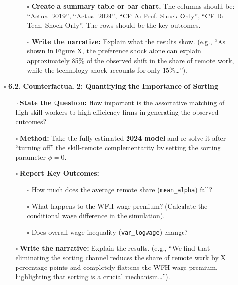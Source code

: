 \documentclass[
  11pt,
  letterpaper,
  DIV=11,
  numbers=noendperiod]{scrartcl}
\providecommand{\tightlist}{%
  \setlength{\itemsep}{0pt}\setlength{\parskip}{0pt}}\usepackage{longtable,booktabs,array}
\begin{document}
\begin{itemize}
\begin{itemize}
    \begin{itemize}
    \tightlist
    \item[$\square$]
      \textbf{Create a summary table or bar chart.} The columns should
      be: ``Actual 2019'', ``Actual 2024'', ``CF A: Pref. Shock Only'',
      ``CF B: Tech. Shock Only''. The rows should be the key outcomes.
    \item[$\square$]
      \textbf{Write the narrative:} Explain what the results show.
      (e.g., ``As shown in Figure X, the preference shock alone can
      explain approximately 85\% of the observed shift in the share of
      remote work, while the technology shock accounts for only
      15\%\ldots{}'').
    \end{itemize}
  \end{itemize}
\item[$\square$]
  \textbf{6.2. Counterfactual 2: Quantifying the Importance of Sorting}

  \begin{itemize}
  \tightlist
  \item[$\square$]
    \textbf{State the Question:} How important is the assortative
    matching of high-skill workers to high-efficiency firms in
    generating the observed outcomes?
  \item[$\square$]
    \textbf{Method:} Take the fully estimated \textbf{2024 model} and
    re-solve it after ``turning off'' the skill-remote complementarity
    by setting the sorting parameter \textbf{\(\phi = 0\)}.
  \item[$\square$]
    \textbf{Report Key Outcomes:}

    \begin{itemize}
    \tightlist
    \item[$\square$]
      How much does the average remote share (\texttt{mean\_alpha})
      fall?
    \item[$\square$]
      What happens to the WFH wage premium? (Calculate the conditional
      wage difference in the simulation).
    \item[$\square$]
      Does overall wage inequality (\texttt{var\_logwage}) change?
    \end{itemize}
  \item[$\square$]
    \textbf{Write the narrative:} Explain the results. (e.g., ``We find
    that eliminating the sorting channel reduces the share of remote
    work by X percentage points and completely flattens the WFH wage
    premium, highlighting that sorting is a crucial
    mechanism\ldots{}'').
  \end{itemize}
\end{itemize}
\end{document}
